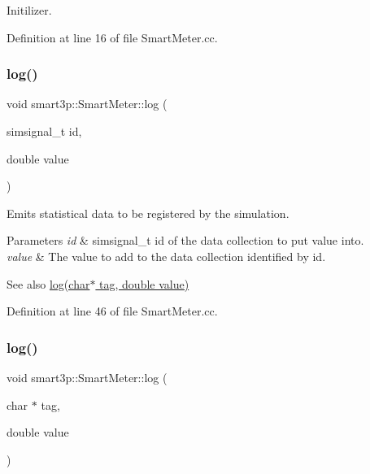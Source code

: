 Initilizer. 



Definition at line 16 of file Smart\+Meter.\+cc.

\mbox{\label{classsmart3p_1_1SmartMeter_ac65e2f27b0a9d2545000baac6e1e574d}} 
\subsubsection{\texorpdfstring{log()}{log()}\hspace{0.1cm}{\footnotesize\ttfamily [1/2]}}
{\footnotesize\ttfamily void smart3p\+::\+Smart\+Meter\+::log (\begin{DoxyParamCaption}\item[{simsignal\+\_\+t}]{id,  }\item[{double}]{value }\end{DoxyParamCaption})}

Emits statistical data to be registered by the simulation. 
\begin{DoxyParams}{Parameters}
{\em id} & simsignal\+\_\+t id of the data collection to put value into. \\
\hline
{\em value} & The value to add to the data collection identified by id. \\
\hline
\end{DoxyParams}
\begin{DoxySeeAlso}{See also}
\hyperlink{classsmart3p_1_1SmartMeter_af92e8b7e3eaf5d1ec6e3c3f5082e8c14}{log(char$\ast$ tag, double value)} 
\end{DoxySeeAlso}


Definition at line 46 of file Smart\+Meter.\+cc.

\mbox{\label{classsmart3p_1_1SmartMeter_af92e8b7e3eaf5d1ec6e3c3f5082e8c14}} 
\subsubsection{\texorpdfstring{log()}{log()}\hspace{0.1cm}{\footnotesize\ttfamily [2/2]}}
{\footnotesize\ttfamily void smart3p\+::\+Smart\+Meter\+::log (\begin{DoxyParamCaption}\item[{char $\ast$}]{tag,  }\item[{double}]{value }\end{DoxyParamCaption})}

